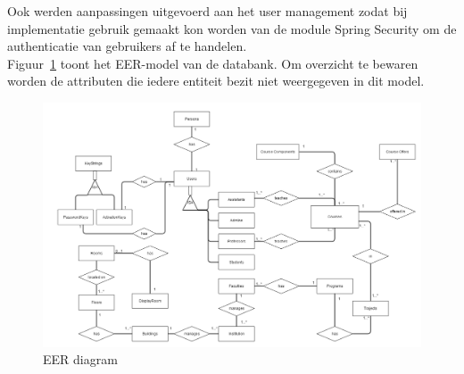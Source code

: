 Ook werden aanpassingen uitgevoerd aan het user management zodat bij implementatie gebruik gemaakt kon worden van de module Spring Security\cite{spring-security} om de authenticatie van gebruikers af te handelen.\\

Figuur~\ref{fig:EER diagram} toont het EER-model van de databank. Om overzicht te bewaren worden de attributen die iedere entiteit bezit niet weergegeven in dit model.

\begin{figure}[H]
	\centering
	\includegraphics[scale=0.4]{img/ER2-gliffy}
	\caption{EER diagram}
	\label{fig:EER diagram}
\end{figure}